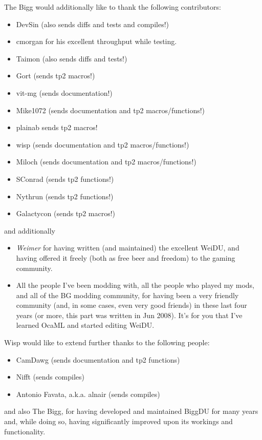 \documentclass{article}
\begin{document}
The Bigg would additionally like to thank the following contributors:
\begin{itemize}
\item DevSin (also sends diffs and tests and compiles!)
\item cmorgan for his excellent throughput while testing.
\item Taimon (also sends diffs and tests!)
\item Gort (sends tp2 macros!)
\item vit-mg (sends documentation!)
\item Mike1072 (sends documentation and tp2 macros/functions!)
\item plainab {sends tp2 macros!}
\item wisp (sends documentation and tp2 macros/functions!)
\item Miloch (sends documentation and tp2 macros/functions!)
\item SConrad (sends tp2 functions!)
\item Nythrun (sends tp2 functions!)
\item Galactycon (sends tp2 macros!)
\end{itemize}
and additionally
\begin{itemize}
\item {\em Weimer} for having written (and maintained) the excellent WeiDU,
and having offered it freely (both as free beer and freedom) to the gaming
community.
\item All the people I've been modding with, all the people who played my mods,
and all of the BG modding community, for having been a very friendly community
(and, in some cases, even very good friends) in these last four years (or more,
this part was written in Jun 2008). It's for you that I've learned OcaML and
started editing WeiDU.
\end{itemize}

Wisp would like to extend further thanks to the following people:
\begin{itemize}
\item CamDawg (sends documentation and tp2 functions)
\item Nifft (sends compiles)
\item Antonio Favata, a.k.a. alnair (sends compiles)
\end{itemize}
and also The Bigg, for having developed and maintained BiggDU for many years and, while doing so, having significantly improved upon its workings and functionality.

\end{document}
